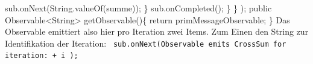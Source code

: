 \documentclass[12pt,oneside,a4paper,bibtotoc,liststotoc]{scrreprt}
\begin{document}
                      sub.onNext(String.valueOf(summe));\newline
                  \}\newline
                   sub.onCompleted();\newline
              \}\newline
           \}\newline
   );\newline
\newline
  public Observable<String> getObservable()\{\newline
       return primMessageObservable;\newline
   \}\newline
\newline
Das Observable emittiert also hier pro Iteration zwei Items. Zum Einen den String zur Identifikation der Iteration:\newline
\texttt{\newline
sub.onNext(\grqq Observable emits CrossSum for iteration: \grqq + i );\newline
}\newline
\end{document}
